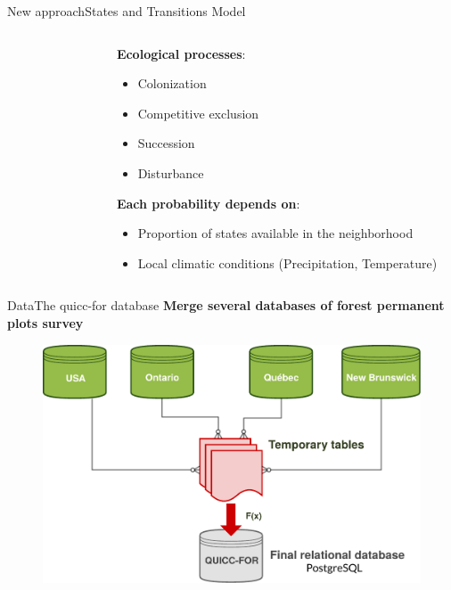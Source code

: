 \documentclass[10pt,aspectratio=149]{beamer}
\begin{document}

\begin{frame}{New approach}{States and Transitions Model}


\begin{columns}[t]
	\begin{column}[t]{.40\paperwidth}
		\begin{figure}
			\small{}
		\end{figure}
	\end{column}
	\begin{column}[t]{.50\paperwidth}
	\textbf{Ecological processes}:
	\begin{itemize}
		\item Colonization
		\item Competitive exclusion
		\item Succession
		\item Disturbance
	\end{itemize}
	\vspace{1em}
	\textbf{Each probability depends on}:
		\begin{itemize}
			\item Proportion of states available in the neighborhood
			\item Local climatic conditions (Precipitation, Temperature)
		\end{itemize}
	\end{column}
\end{columns}

\end{frame}



\begin{frame}{Data}{The quicc-for database}
	\vspace{-1em}
	\center \textbf{Merge several databases of forest permanent plots survey}
\begin{figure}
	\includegraphics[width=.70\paperwidth]{Figs/quiccfor.pdf}
\end{figure}

\end{frame}
\end{document}
